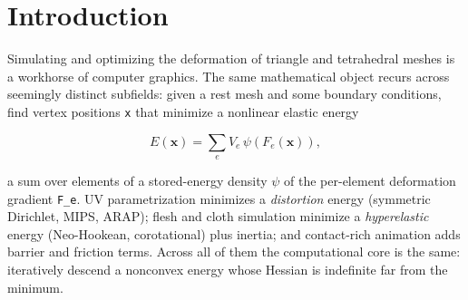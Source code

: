 \documentclass{egpubl}
\begin{document}
\begin{abstract}
Of the 160 extracted superiority edges, only \textbf{2 are independently validated} and \textbf{64 qualified}
by our measurements; the rest remain the papers' own word pending faithful re-measurement. This is
the honest core: rather than a leaderboard, the benchmark and its \textbf{adversarial review loop} --- in
which the harness's confound-untangling is applied reflexively to our \emph{own} conclusions, forcing
repeated retractions --- offer a reproducible \emph{method for honest attribution}. We release the harness,
claims graph, and figures as the seed of a living benchmark.

\textbf{Scope.} The v1 measurements are largely a 2D prototype (small meshes, indicative not definitive),
now extended by a sparse analytic-Hessian 3D path that scales to \textasciitilde{}130K tetrahedra and a minimal but
faithful 2D IPC that opens the contact track (settling IPC's intersection-free guarantee); every
headline is reported with its regime of validity, and mesh--mesh/GPU-scale contact and larger studies
remain future work. The contribution is the attribution \emph{method} and the survey scaffolding, not
a settled ranking.
\end{abstract}

\section{Introduction}

Simulating and optimizing the deformation of triangle and tetrahedral meshes is a workhorse of
computer graphics. The same mathematical object recurs across seemingly distinct subfields: given a
rest mesh and some boundary conditions, find vertex positions \texttt{x} that minimize a nonlinear elastic
energy

\begin{equation}
  E(\mathbf{x}) = \sum_e V_e\, \psi\!\left(F_e(\mathbf{x})\right),
\end{equation}

a sum over elements of a stored-energy density \texttt{$\psi$} of the per-element deformation gradient \texttt{F\_e}.
UV parametrization minimizes a \emph{distortion} energy (symmetric Dirichlet, MIPS, ARAP); flesh and cloth
simulation minimize a \emph{hyperelastic} energy (Neo-Hookean, corotational) plus inertia; and
contact-rich animation adds barrier and friction terms. Across all of them the computational core is
the same: iteratively descend a nonconvex energy whose Hessian is indefinite far from the minimum.
\end{document}
